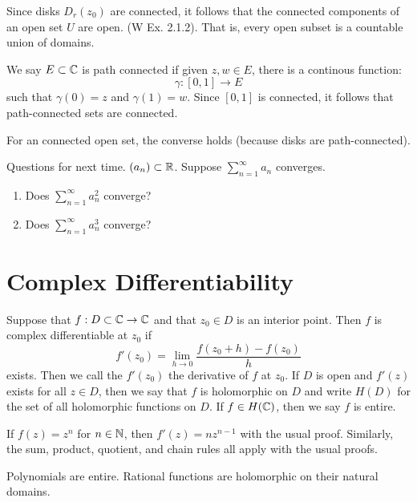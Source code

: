 \documentclass[12pt]{amsart}
\begin{document}
Since disks $D_r(z_0)$ are connected, it follows that the connected components of an open set $U$ are open. (W Ex. 2.1.2). That is, every open subset is a countable union of domains. 

We say $E \subset \mathbb C$ is path connected if given $z, w \in E$, there is a continous function: 
\[ \gamma: [0, 1] \to E \]
such that $\gamma(0) = z$ and $\gamma(1) = w$. Since $[0, 1]$ is connected, it follows that path-connected sets are connected. 

For an connected open set, the converse holds (because disks are path-connected). 

Questions for next time. 
$(a_n) \subset \mathbb R$. Suppose $\sum_{n=1}^\infty a_n$ converges. 
\begin{enumerate}
    \item[Q1.] Does $\sum_{n=1}^\infty a_n^2$ converge? 
    \item[Q2.] Does $\sum_{n=1}^\infty a_n^3$ converge? 
\end{enumerate}

\section{Complex Differentiability}

\begin{definition}
    Suppose that $f: D \subset \mathbb C \to \mathbb C$ and that $z_0 \in D$ is an interior point. Then $f$ is complex differentiable at $z_0$ if 
    \[ f'(z_0) = \lim_{h\to 0} \frac{f(z_0+h) - f(z_0)}{h}\]
    exists. Then we call the $f'(z_0)$ the derivative of $f$ at $z_0$. If $D$ is open and $f'(z)$ exists for all $z \in D$, then we say that $f$ is holomorphic on $D$ and write $H(D)$ for the set of all holomorphic functions on $D$. If $f \in H(\mathbb C)$, then we say $f$ is entire. 
\end{definition}

\begin{remark}
    If $f(z) = z^n$ for $n \in \mathbb N$, then $f'(z) = nz^{n-1}$ with the usual proof. Similarly, the sum, product, quotient, and chain rules all apply with the usual proofs. 
\end{remark}

\begin{remark}
    Polynomials are entire. Rational functions are holomorphic on their natural domains.
\end{remark}
\end{document}
